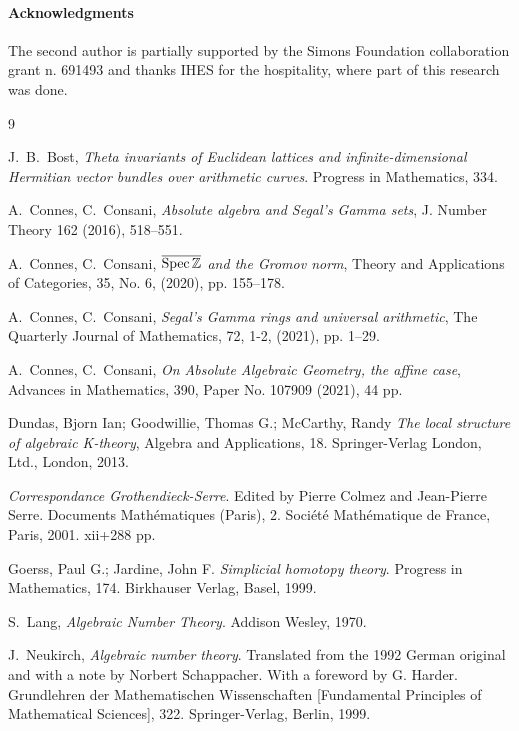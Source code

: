 \documentclass[cupthm]{CUP-JNL-JMJ}
\numberwithin{equation}{section}
\theoremstyle{cupplain}
\theoremstyle{cupdefinition}
\theoremstyle{cupremark}
\theoremstyle{cupproof}
\def\Z{{\mathbb Z}}
\def\Spec{{\rm Spec\,}}
\def\spzb{{\overline{\Spec\Z}}}
\begin{document}
\begin{Backmatter}

\paragraph{Acknowledgments}
The second author is partially supported by the Simons Foundation collaboration grant n. 691493 and thanks IHES for the hospitality,  where part of this research was done.





\begin{thebibliography}{9}

 J.~B.~Bost, 
{\em Theta invariants of Euclidean lattices and infinite-dimensional Hermitian vector bundles over arithmetic curves}. 
Progress in Mathematics, 334.

 A.~Connes, C.~Consani, {\em Absolute algebra and Segal's Gamma sets},  J. Number Theory 162 (2016), 518--551.

 A.~Connes, C.~Consani, {\em $\spzb$ and the Gromov norm}, Theory and Applications of
Categories, 35, No. 6, (2020), pp. 155--178. 

 A.~Connes, C.~Consani, {\em Segal's Gamma rings and universal arithmetic}, The Quarterly
Journal of Mathematics, 72, 1-2, (2021), pp. 1--29.

   A.~Connes, C.~Consani, {\em On Absolute Algebraic Geometry, the affine case},  Advances in
Mathematics, 390, Paper No. 107909 (2021), 44 pp.

 Dundas, Bjorn Ian; Goodwillie, Thomas G.; McCarthy, Randy {\em The local structure of algebraic K-theory}, Algebra and Applications, 18. Springer-Verlag London, Ltd., London, 2013.

 {\em Correspondance Grothendieck-Serre}.  Edited by Pierre Colmez and Jean-Pierre Serre. Documents Math\'ematiques (Paris), 2. Soci\'et\'e Math\'ematique de France, Paris, 2001. xii+288 pp.

 Goerss, Paul G.; Jardine, John F. {\em Simplicial homotopy theory}. Progress in Mathematics, 174. Birkhauser Verlag, Basel, 1999.

 S.~Lang, {\em Algebraic Number Theory}. Addison Wesley, 1970.

 J.~Neukirch, {\em Algebraic number theory}. Translated from the 1992 German original and with a note by Norbert Schappacher. With a foreword by G. Harder. Grundlehren der Mathematischen Wissenschaften [Fundamental Principles of Mathematical Sciences], 322. Springer-Verlag, Berlin, 1999.


\end{thebibliography}
\end{Backmatter}
\end{document}
